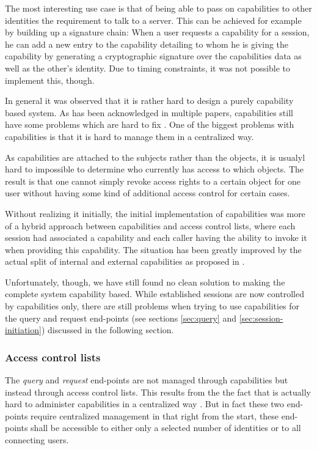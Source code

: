 The most interesting use case is that of being able to pass on capabilities to other identities the requirement to talk to a server.
This can be achieved for example by building up a signature chain:
When a user requests a capability for a session, he can add a new entry to the capability detailing to whom he is giving the capability by generating a cryptographic signature over the capabilities data as well as the other's identity.
Due to timing constraints, it was not possible to implement this, though.

\bigskip

In general it was observed that it is rather hard to design a purely capability based system.
As has been acknowledged in multiple papers, capabilities still have some problems which are hard to fix \cite{gong1989secure,shapiro1999eros}.
One of the biggest problems with capabilities is that it is hard to manage them in a centralized way.

As capabilities are attached to the subjects rather than the objects, it is usualyl hard to impossible to determine who currently has access to which objects.
The result is that one cannot simply revoke access rights to a certain object for one user without having some kind of additional access control for certain cases.

Without realizing it initially, the initial implementation of capabilities was more of a hybrid approach between capabilities and access control lists, where each session had associated a capability and each caller having the ability to invoke it when providing this capability.
The situation has been greatly improved by the actual split of internal and external capabilities as proposed in \cite{gong1989secure}.

Unfortunately, though, we have still found no clean solution to making the complete system capability based.
While established sessions are now controlled by capabilities only, there are still problems when trying to use capabilities for the query and request end-points (see sections \ref{sec:query} and \ref{sec:session-initiation}) discussed in the following section.

\subsubsection{Access control lists}

The \emph{query} and \emph{request} end-points are not managed through capabilities but instead through access control lists.
This results from the the fact that is actually hard to administer capabilities in a centralized way \cite{shapiro1999eros}.
But in fact these two end-points require centralized management in that right from the start, these end-points shall be accessible to either only a selected number of identities or to all connecting users.

